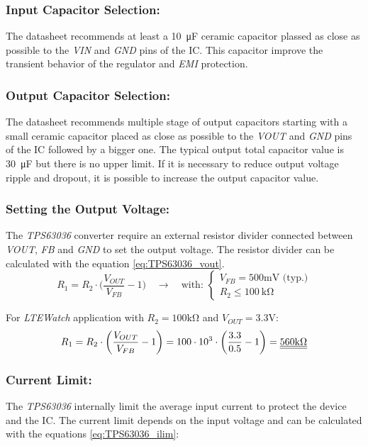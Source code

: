 \documentclass[report.tex]{subfiles}
\begin{document}
\begin{enumerate}
\subsubsection{Input Capacitor Selection:}

The datasheet recommends at least a \SI{10}{\micro\farad} ceramic capacitor plassed as close as possible to the \textit{VIN} and \textit{GND} pins of the IC. This capacitor improve the transient behavior of the regulator and \textit{EMI} protection.

\subsubsection{Output Capacitor Selection:}

The datasheet recommends multiple stage of output capacitors starting with a small ceramic capacitor placed as close as possible to the \textit{VOUT} and \textit{GND} pins of the IC followed by a bigger one. The typical output total capacitor value is \SI{30}{\micro\farad} but there is no upper limit. If it is necessary to reduce output voltage ripple and dropout, it is possible to increase the output capacitor value.

\subsubsection{Setting the Output Voltage:}

The \textit{TPS63036} converter require an external resistor divider connected between \textit{VOUT}, \textit{FB} and \textit{GND} to set the output voltage. The resistor divider can be calculated with the equation \ref{eq:TPS63036_vout}.
\begin{equation}
\label{eq:TPS63036_vout}
\boxed{R_1 = R_2 \cdot \bigg(\dfrac{V_{OUT}}{V_{FB}} - 1\bigg) \quad \rightarrow \quad \text{with: } 
\begin{cases}
V_{FB} = 500\si{\milli\volt} \text{ (typ.)}\\
R_2 \leq \SI{100}{\kilo\ohm}
\end{cases}}
\end{equation}


For \textit{LTEWatch} application with $R_2 = 100\si{\kilo\ohm}$ and $V_{OUT} = 3.3\si{\volt}$:
$$
R_1 = R_2 \cdot \bigg(\dfrac{V_{OUT}}{V_{FB}} - 1 \bigg) = 100\cdot 10^3 \cdot \bigg(\dfrac{3.3}{0.5} - 1 \bigg) = \underline{\underline{560\si{\kilo\ohm}}}
$$

\subsubsection{Current Limit:}
The \textit{TPS63036} internally limit the average input current to protect the device and the IC. The current limit depends on the input voltage and can be calculated with the equations \ref{eq:TPS63036_ilim}:


\end{enumerate}
\end{document}
